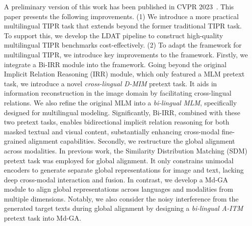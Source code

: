 \documentclass[10pt,journal,compsoc]{IEEEtran}
\begin{document}
A preliminary version of this work has been published in CVPR 2023~\cite{jiang2023cross}. This paper presents the following improvements. 
(1) We introduce a more practical multilingual TIPR task that extends beyond the former traditional TIPR task. To support this, we develop the LDAT pipeline to construct high-quality multilingual TIPR benchmarks cost-effectively.
(2) To adapt the framework for multilingual TIPR, we introduce key improvements to the framework. 
Firstly, we integrate a Bi-IRR module into the framework. Going beyond the original Implicit Relation Reasoning (IRR) module, which only featured a MLM pretext task, we introduce a novel \emph{cross-lingual D-MIM} pretext task. It aids in information reconstruction in the image domain by facilitating cross-lingual relations. 
We also refine the original MLM into a \emph{bi-lingual MLM}, specifically designed for multilingual modeling.
Significantly, Bi-IRR, combined with these two pretext tasks, enables bidirectional implicit relation reasoning for both masked textual and visual content, substantially enhancing cross-modal fine-grained alignment capabilities.
Secondly, we restructure the global alignment across modalities. 
In previous work, the Similarity Distribution Matching (SDM) pretext task was employed for global alignment. It only constrains unimodal encoders to generate separate global representations for image and text, lacking deep cross-modal interaction and fusion.
In contrast, we develop a Md-GA module to align global representations across languages and modalities from multiple dimensions.
Notably, we also consider the noisy interference from the generated target texts during global alignment by designing a \emph{bi-lingual A-ITM} pretext task into Md-GA.
\end{document}
